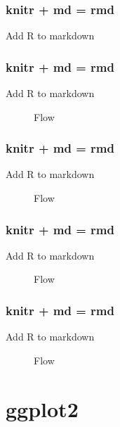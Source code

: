 \documentclass{beamer}
\begin{document}
\begin{frame}
	\frametitle{knitr + md = rmd}
	Add R to markdown
\end{frame}

\begin{frame}
	\frametitle{knitr + md = rmd}
	Add R to markdown
	\begin{figure}
		\qquad
		\caption{Flow}
		\label{fig:1}
	\end{figure}
\end{frame}

\begin{frame}
	\frametitle{knitr + md = rmd}
	Add R to markdown
	\begin{figure}
		\qquad
		\qquad
		\caption{Flow}
		\label{fig:1}
	\end{figure}
\end{frame}

\begin{frame}
	\frametitle{knitr + md = rmd}
	Add R to markdown
	\begin{figure}
		\qquad
		\qquad
		\qquad
		\caption{Flow}
		\label{fig:1}
	\end{figure}
\end{frame}

\begin{frame}
	\frametitle{knitr + md = rmd}
	Add R to markdown
	\begin{figure}
		\qquad
		\qquad
		\qquad
		\qquad
		\caption{Flow}
		\label{fig:1}
	\end{figure}
\end{frame}

\section{ggplot2}
\end{document}
